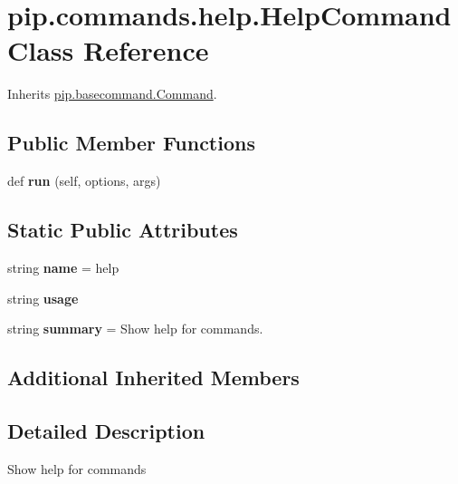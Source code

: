 \hypertarget{classpip_1_1commands_1_1help_1_1_help_command}{}\section{pip.\+commands.\+help.\+Help\+Command Class Reference}
\label{classpip_1_1commands_1_1help_1_1_help_command}


Inherits \hyperlink{classpip_1_1basecommand_1_1_command}{pip.\+basecommand.\+Command}.

\subsection*{Public Member Functions}
\begin{DoxyCompactItemize}
\item 
\mbox{\label{classpip_1_1commands_1_1help_1_1_help_command_a3b2630d4f3fa62e14c9fc9007ce28f9f}} 
def {\bfseries run} (self, options, args)
\end{DoxyCompactItemize}
\subsection*{Static Public Attributes}
\begin{DoxyCompactItemize}
\item 
\mbox{\label{classpip_1_1commands_1_1help_1_1_help_command_a218f7e0193b98f6ea1a8a076c14017dc}} 
string {\bfseries name} = \textquotesingle{}help\textquotesingle{}
\item 
string {\bfseries usage}
\item 
\mbox{\label{classpip_1_1commands_1_1help_1_1_help_command_a9b5afee81df4a43a6026d0d260adfe27}} 
string {\bfseries summary} = \textquotesingle{}Show help for commands.\textquotesingle{}
\end{DoxyCompactItemize}
\subsection*{Additional Inherited Members}


\subsection{Detailed Description}
\begin{DoxyVerb}Show help for commands\end{DoxyVerb}
 

